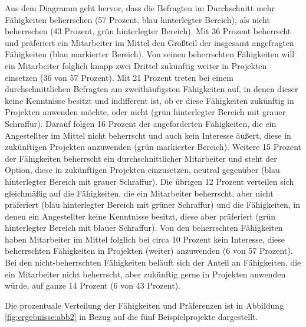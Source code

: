 Aus dem Diagramm geht hervor, dass die Befragten im Durchschnitt mehr Fähigkeiten beherrschen (57 Prozent, blau hinterlegter Bereich), als nicht beherrschen (43 Prozent, grün hinterlegter Bereich).
Mit 36 Prozent beherrscht und präferiert ein Mitarbeiter im Mittel den Großteil der insgesamt angefragten Fähigkeiten (blau markierter Bereich).
Von seinen beherrschten Fähigkeiten will ein Mitarbeiter folglich knapp zwei Drittel zukünftig weiter in Projekten einsetzen (36 von 57 Prozent).
Mit 21 Prozent treten bei einem durchschnittlichen Befragten am zweithäufigsten Fähigkeiten auf, in denen dieser keine Kenntnisse besitzt und indifferent ist, ob er diese Fähigkeiten zukünftig in Projekten anwenden möchte, oder nicht (grün hinterlegter Bereich mit grauer Schraffur).
Darauf folgen 16 Prozent der angeforderten Fähigkeiten, die ein Angestellter im Mittel nicht beherrscht und auch kein Interesse äußert, diese in zukünftigen Projekten anzuwenden (grün markierter Bereich).
Weitere 15 Prozent der Fähigkeiten beherrscht ein durchschnittlicher Mitarbeiter und steht der Option, diese in zukünftigen Projekten einzusetzen, neutral gegenüber (blau hinterlegter Bereich mit grauer Schraffur). 
Die übrigen 12 Prozent verteilen sich gleichmäßig auf die Fähigkeiten, die ein Mitarbeiter beherrscht, aber nicht präferiert (blau hinterlegter Bereich mit grüner Schraffur) und die Fähigkeiten, in denen ein Angestellter keine Kenntnisse besitzt, diese aber präferiert (grün hinterlegter Bereich mit blauer Schraffur).
Von den beherrschten Fähigkeiten haben Mitarbeiter im Mittel folglich bei circa 10 Prozent kein Interesse, diese beherrschten Fähigkeiten in Projekten (weiter) anzuwenden (6 von 57 Prozent).
Bei den nicht-beherrschten Fähigkeiten beläuft sich der Anteil an Fähigkeiten, die ein Mitarbeiter nicht beherrscht, aber zukünftig gerne in Projekten anwenden würde, auf ganze 14 Prozent (6 von 43 Prozent).

Die prozentuale Verteilung der Fähigkeiten und Präferenzen ist in Abbildung \ref{fig:ergebnisse:abb2} in Bezug auf die fünf Beispielprojekte dargestellt.

